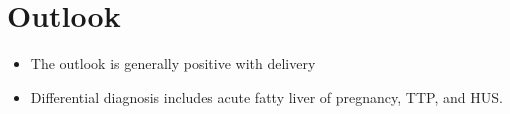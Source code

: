 \section{Outlook}
\begin{itemize}[noitemsep]
  \item The outlook is generally positive with delivery
  \item Differential diagnosis includes acute fatty liver of pregnancy, TTP, and HUS.
\end{itemize}
